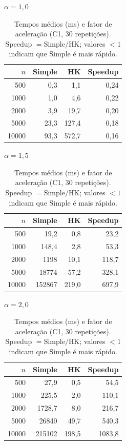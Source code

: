 \documentclass{infufrgs}
\begin{document}
\begin{table}[H]
\centering
\caption{Tempos médios (ms) e fator de aceleração (C1, 30 repetições). Speedup $= \text{Simple}/\text{HK}$; valores $< 1$ indicam que Simple é mais rápido.}
\label{tab:c1-scalability}
\footnotesize
\begin{minipage}[t]{0.30\linewidth}
\centering
\textit{$\alpha = 1{,}0$}\\[3pt]
\begin{tabular}{rrrr}
\toprule
$n$ & Simple & HK & Speedup \\
\midrule
500   &    0{,}3  &   1{,}1 &  0{,}24 \\
1000  &    1{,}0  &   4{,}6 &  0{,}22 \\
2000  &    3{,}9  &  19{,}7 &  0{,}20 \\
5000  &   23{,}3  & 127{,}4 &  0{,}18 \\
10000 &   93{,}3  & 572{,}7 &  0{,}16 \\
\bottomrule
\end{tabular}
\end{minipage}\hfill
\begin{minipage}[t]{0.30\linewidth}
\centering
\textit{$\alpha = 1{,}5$}\\[3pt]
\begin{tabular}{rrrr}
\toprule
$n$ & Simple & HK & Speedup \\
\midrule
500   &   19{,}2 &   0{,}8 &   23{,}2 \\
1000  &  148{,}4 &   2{,}8 &   53{,}3 \\
2000  & 1198     &  10{,}1 &  118{,}7 \\
5000  & 18774    &  57{,}2 &  328{,}1 \\
10000 & 152867   & 219{,}0 &  697{,}9 \\
\bottomrule
\end{tabular}
\end{minipage}\hfill
\begin{minipage}[t]{0.30\linewidth}
\centering
\textit{$\alpha = 2{,}0$}\\[3pt]
\begin{tabular}{rrrr}
\toprule
$n$ & Simple & HK & Speedup \\
\midrule
500   &   27{,}9 &   0{,}5 &   54{,}5 \\
1000  &  225{,}5 &   2{,}0 &  110{,}1 \\
2000  & 1728{,}7 &   8{,}0 &  216{,}7 \\
5000  & 26840    &  49{,}7 &  540{,}3 \\
10000 & 215102   & 198{,}5 & 1083{,}8 \\
\bottomrule
\end{tabular}
\end{minipage}
\end{table}
\end{document}
